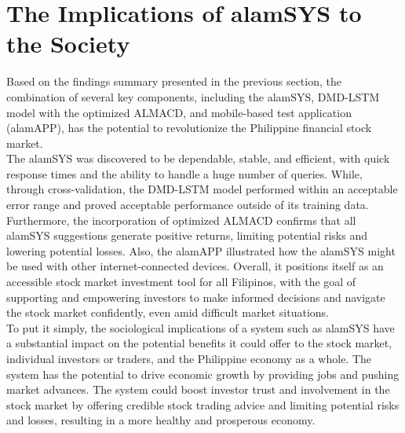 \section{The Implications of alamSYS to the Society}
\label{sec:implications}
Based on the findings summary presented in the previous section, the 
combination of several key components, including the alamSYS, 
DMD-LSTM model with the optimized ALMACD, and mobile-based test application 
(alamAPP), has the potential to revolutionize the Philippine financial 
stock market.
\\

The alamSYS was discovered to be dependable, stable, and efficient, with 
quick response times and the ability to handle a huge number of queries. 
While, through cross-validation, the DMD-LSTM model performed within an acceptable 
error range and proved acceptable performance outside of its training data.
\\

Furthermore, the incorporation of optimized ALMACD confirms that all alamSYS 
suggestions generate positive returns, limiting potential risks and 
lowering potential losses. Also, the alamAPP illustrated how the alamSYS might 
be used with other internet-connected devices. Overall, it positions itself 
as an accessible stock market investment tool for all Filipinos, with the 
goal of supporting and empowering investors to make informed decisions 
and navigate the stock market confidently, even amid difficult market 
situations.
\\

To put it simply, the sociological implications of a system such as alamSYS 
have a substantial impact on the potential benefits it could offer to the 
stock market, individual investors or traders, and the Philippine economy 
as a whole. The system has the potential to drive economic growth by 
providing jobs and pushing market advances. The system could boost investor 
trust and involvement in the stock market by offering credible stock trading 
advice and limiting potential risks and losses, resulting in a more healthy 
and prosperous economy.
\\